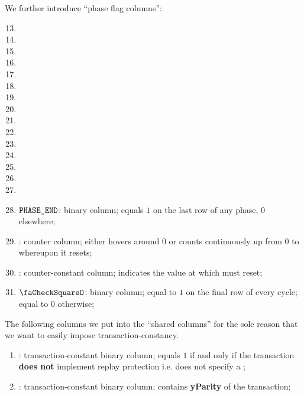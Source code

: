 We further introduce ``phase flag columns'':
\begin{multicols}{3}
    \begin{enumerate}[resume]
	\setcounter{enumi}{12}
	\item \phaseRlpPrefix{}
	\item \phaseChainId{}
	\item \phaseNonce{}
	\item \phaseGasPrice{}
	\item \phaseGasLimit{}
	\item \phaseTo{}
	\item \phaseValue{}
	\item \phaseData{}
	\item \phaseAccessList{}
	\item \phaseBeta{}
	\item \phaseMaxPriorityFeePerGas{}
	\item \phaseMaxFeePerGas{}
	\item \phaseY{}
	\item \phaseR{}
	\item \phaseS{}
    \end{enumerate}
\end{multicols}
\begin{enumerate}
	\setcounter{enumi}{27}
    \item $\texttt{PHASE\_END}$:
	binary column; equals $1$ on the last row of any phase, $0$ elsewhere;
    \item \ct{}:
	counter column; 
	either hovers around $0$ or counts continuously up from $0$ to \maxCt{} whereupon it resets;
    \item \maxCt:
	counter-constant column;
	indicates the value at which \ct{} must reset;
    \item $\done$:
	binary column; equal to $1$ on the final row of every \ct{} cycle; equal to $0$ otherwise;
\end{enumerate}
The following columns we put into the ``shared columns'' for the sole reason that we want to easily impose transaction-constancy.
\begin{enumerate}
        \item 
	    \rlpTxnCommonColumnReplayProtection{}:
	    transaction-constant binary column;
	    equals $1$ if and only if the transaction \textbf{does not} implement replay protection i.e.
	    does not specify a \chainId{};
	\item
	    \rlpTxnCommonColumnYparity{}:
	    transaction-constant binary column;
	    contains \textbf{yParity} of the transaction;
\end{enumerate}
